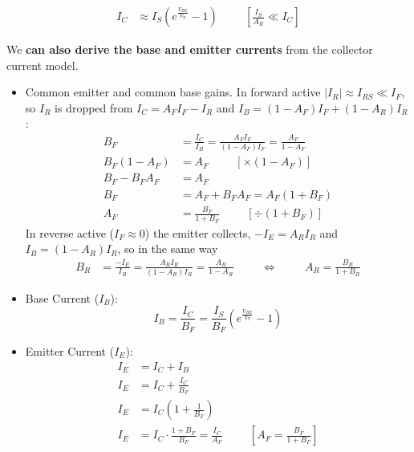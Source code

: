 \begin{itemize}
\begin{itemize}
\begin{itemize}
\begin{align*}
              I_C &\approx I_S \left( e^{\frac{V_{BE}}{V_T}} - 1 \right) \hspace{1cm} \left[\frac{I_S}{A_R} \ll I_C\right]
            \end{align*}
        \end{itemize}
        We \textbf{can also derive the base and emitter currents} from the collector
        current model.
        \begin{itemize}
          \item Common emitter and common base gains. In forward active
            \(|I_R| \approx I_{RS} \ll I_F\), so \(I_R\) is dropped from
            \(I_C = A_F I_F - I_R\) and \(I_B = (1 - A_F) I_F + (1 - A_R) I_R\):
            \begin{align*}
              B_F &= \frac{I_C}{I_B} = \frac{A_F I_F}{(1 - A_F) I_F} = \frac{A_F}{1 - A_F} \\
              B_F (1 - A_F) &= A_F \hspace{1cm} [\times (1 - A_F)] \\
              B_F - B_F A_F &= A_F \\
              B_F &= A_F + B_F A_F = A_F (1 + B_F) \\
              A_F &= \frac{B_F}{1 + B_F} \hspace{1cm} [\div (1 + B_F)]
            \end{align*}
            In reverse active (\(I_F \approx 0\)) the emitter collects,
            \(-I_E = A_R I_R\) and \(I_B = (1 - A_R) I_R\), so in the same way
            \begin{align*}
              B_R &= \frac{-I_E}{I_B} = \frac{A_R I_R}{(1 - A_R) I_R} = \frac{A_R}{1 - A_R}
              \hspace{1cm} \Leftrightarrow \hspace{1cm} A_R = \frac{B_R}{1 + B_R}
            \end{align*}
          \item Base Current (\(I_B\)):
            \[
              I_B = \frac{I_C}{B_F} = \frac{I_S}{B_F}\left( e^{\frac{V_{BE}}{V_T}} - 1 \right)
            \]
          \item Emitter Current (\(I_E\)):
            \begin{align*}
              I_E &= I_C + I_B \\
              I_E &= I_C + \frac{I_C}{B_F} \\
              I_E &= I_C \left( 1 + \frac{1}{B_F} \right) \\
              I_E &= I_C \cdot \frac{1 + B_F}{B_F} = \frac{I_C}{A_F} \hspace{1cm} \left[A_F = \frac{B_F}{1 + B_F}\right] \\

\end{align*}
\end{itemize}
\end{itemize}
\end{itemize}
